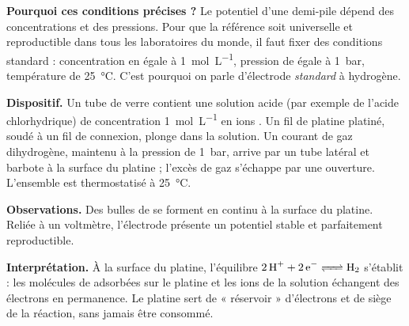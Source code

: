 \documentclass[11pt]{article}
\newcommand{\cle}[1]{{\popxbold\color{popdark}#1}}
\begin{document}
\textbf{Pourquoi ces conditions précises ?} Le potentiel d'une demi-pile dépend des concentrations et des pressions. Pour que la référence soit universelle et reproductible dans tous les laboratoires du monde, il faut fixer des \cle{conditions standard} : concentration en  égale à \SI{1}{mol.L^{-1}}, pression de  égale à \SI{1}{bar}, température de \SI{25}{\celsius}. C'est pourquoi on parle d'électrode \emph{standard} à hydrogène.

\begin{experience}
\textbf{Dispositif.} Un tube de verre contient une solution acide (par exemple de l'acide chlorhydrique) de concentration \SI{1}{mol.L^{-1}} en ions . Un fil de platine platiné, soudé à un fil de connexion, plonge dans la solution. Un courant de gaz dihydrogène, maintenu à la pression de \SI{1}{bar}, arrive par un tube latéral et barbote à la surface du platine ; l'excès de gaz s'échappe par une ouverture. L'ensemble est thermostatisé à \SI{25}{\celsius}.

\textbf{Observations.} Des bulles de  se forment en continu à la surface du platine. Reliée à un voltmètre, l'électrode présente un potentiel stable et parfaitement reproductible.

\textbf{Interprétation.} À la surface du platine, l'équilibre $\ce{2H+ + 2e- <=> H2}$ s'établit : les molécules de  adsorbées sur le platine et les ions  de la solution échangent des électrons en permanence. Le platine sert de « réservoir » d'électrons et de siège de la réaction, sans jamais être consommé.
\end{experience}
\end{document}
